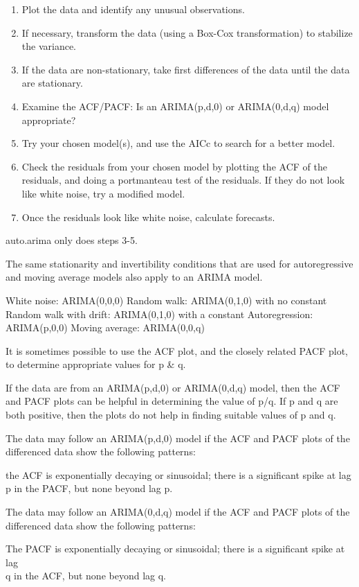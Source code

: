 \documentclass[]{book}
\begin{document}
\begin{enumerate}
\def\labelenumi{\arabic{enumi}.}
\item
  Plot the data and identify any unusual observations.
\item
  If necessary, transform the data (using a Box-Cox transformation) to stabilize the variance.
\item
  If the data are non-stationary, take first differences of the data until the data are stationary.
\item
  Examine the ACF/PACF: Is an ARIMA(p,d,0) or ARIMA(0,d,q) model appropriate?
\item
  Try your chosen model(s), and use the AICc to search for a better model.
\item
  Check the residuals from your chosen model by plotting the ACF of the residuals, and doing a portmanteau test of the residuals. If they do not look like white noise, try a modified model.
\item
  Once the residuals look like white noise, calculate forecasts.
\end{enumerate}

auto.arima only does steps 3-5.

The same stationarity and invertibility conditions that are used for autoregressive and moving average models also apply to an ARIMA model.

White noise: ARIMA(0,0,0)
Random walk: ARIMA(0,1,0) with no constant
Random walk with drift: ARIMA(0,1,0) with a constant
Autoregression: ARIMA(p,0,0)
Moving average: ARIMA(0,0,q)

It is sometimes possible to use the ACF plot, and the closely related PACF plot, to determine appropriate values for p \& q.

If the data are from an ARIMA(p,d,0) or ARIMA(0,d,q) model, then the ACF and PACF plots can be helpful in determining the value of p/q. If p and q are both positive, then the plots do not help in finding suitable values of p and q.

The data may follow an ARIMA(p,d,0) model if the ACF and PACF plots of the differenced data show the following patterns:

the ACF is exponentially decaying or sinusoidal; there is a significant spike at lag p in the PACF, but none beyond lag p.

The data may follow an ARIMA(0,d,q) model if the ACF and PACF plots of the differenced data show the following patterns:

The PACF is exponentially decaying or sinusoidal; there is a significant spike at lag\\
q in the ACF, but none beyond lag q.
\end{document}
